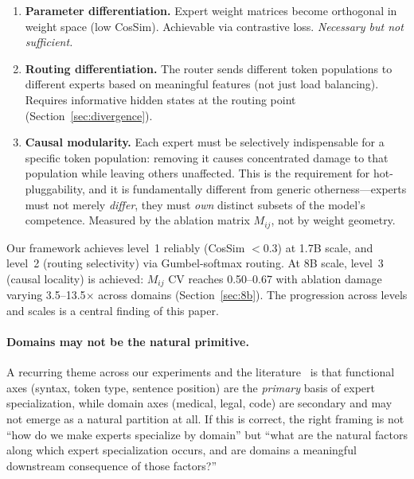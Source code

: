 \documentclass{article}
\begin{document}
\begin{enumerate}[nosep]
    \item \textbf{Parameter differentiation.} Expert weight matrices become
          orthogonal in weight space (low CosSim). Achievable via contrastive
          loss. \emph{Necessary but not sufficient.}
    \item \textbf{Routing differentiation.} The router sends different token
          populations to different experts based on meaningful features (not
          just load balancing). Requires informative hidden states at the
          routing point (Section~\ref{sec:divergence}).
    \item \textbf{Causal modularity.} Each expert must be selectively
          indispensable for a specific token population: removing it causes
          concentrated damage to that population while leaving others
          unaffected. This is the requirement for hot-pluggability, and it is
          fundamentally different from generic otherness---experts must not
          merely \emph{differ}, they must \emph{own} distinct subsets of the
          model's competence. Measured by the ablation matrix $M_{ij}$, not by
          weight geometry.
\end{enumerate}

Our framework achieves level~1 reliably (CosSim $<$0.3) at 1.7B scale,
and level~2 (routing selectivity) via Gumbel-softmax routing. At 8B scale,
level~3 (causal locality) is achieved: $M_{ij}$ CV reaches 0.50--0.67 with
ablation damage varying 3.5--13.5$\times$ across domains
(Section~\ref{sec:8b}). The progression across levels and scales is a
central finding of this paper.

\paragraph{Domains may not be the natural primitive.}
A recurring theme across our experiments and the literature~\cite{standing2026,
domaindriver2026, openmoe2024} is that functional axes (syntax, token type,
sentence position) are the \emph{primary} basis of expert specialization, while
domain axes (medical, legal, code) are secondary and may not emerge as a
natural partition at all. If this is correct, the right framing is not ``how
do we make experts specialize by domain'' but ``what are the natural factors
along which expert specialization occurs, and are domains a meaningful
downstream consequence of those factors?''
\end{document}
